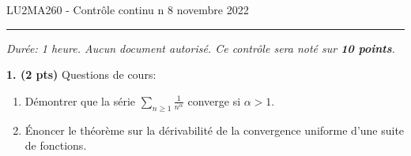 \documentclass[a4paper,10pt]{article}
\newcommand{\R}{\mathbb{R}}
\begin{document}
\noindent LU2MA260 - Contrôle continu n
\hfill 8 novembre 2022
\medskip\hrule
\vspace{.3in}

\emph{Durée: 1 heure. Aucun document autorisé.
Ce contrôle sera noté sur \textbf{10 points}.}

\vspace{.1in}

\noindent
\textbf{1. (2 pts)} Questions de cours:

\begin{enumerate}[label=\alph*)]
    \item Démontrer que la série $\sum_{n\geq1}\frac{1}{n^\alpha}$ converge si $\alpha>1$.
    \item Énoncer le théorème sur la dérivabilité de la convergence uniforme d'une suite de fonctions.
\end{enumerate}




\vspace{.1in}
\end{document}
